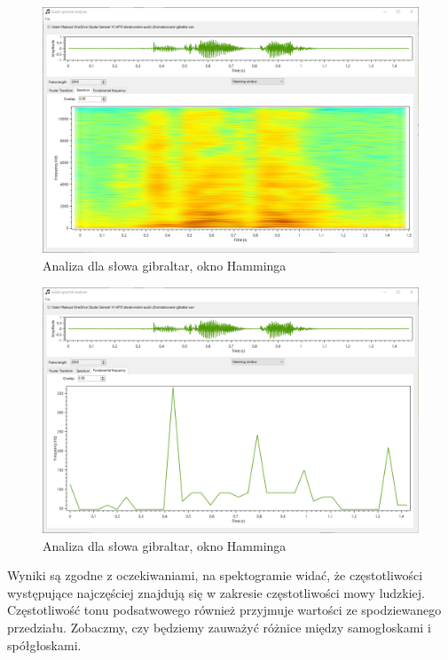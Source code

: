 \documentclass{article}
\begin{document}
\begin{figure}[H]
\includegraphics[width=6in]{scr10.png}
\centering
\caption{Analiza dla słowa gibraltar, okno Hamminga}
\end{figure}

\begin{figure}[H]
\includegraphics[width=6in]{scr11.png}
\centering
\caption{Analiza dla słowa gibraltar, okno Hamminga}
\end{figure}

Wyniki są zgodne z oczekiwaniami, na spektogramie widać, że częstotliwości występujące najczęściej znajdują się w zakresie częstotliwości mowy ludzkiej. Częstotliwość tonu podsatwowego również przyjmuje wartości ze spodziewanego przedziału. Zobaczmy, czy będziemy zauważyć różnice między samogłoskami i spółgłoskami.
\end{document}
